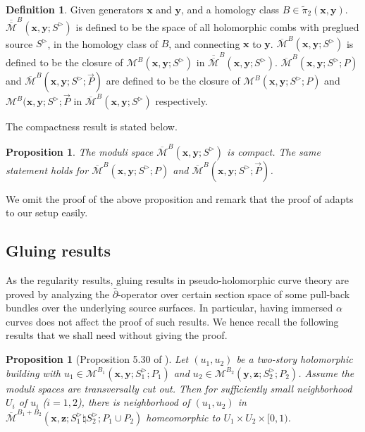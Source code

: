 \documentclass{amsart}
\newtheorem{prop}[thm]{Proposition}
\theoremstyle{definition}
\newtheorem{defn}[thm]{Definition}
\theoremstyle{remark}
\numberwithin{equation}{section}
\numberwithin{equation}{section} \makeatletter
\begin{document}
\begin{defn}
Given generators $\bm{x}$ and $\bm{y}$, and a homology class $B\in \tilde{\pi}_2(\bm{x},\bm{y})$. $\overline{\overline{\mathcal{M}}}^B(\textbf{x},\textbf{y};S^\triangleright)$ is defined to be the space of all holomorphic combs with preglued source $S^\triangleright$, in the homology class of $B$, and connecting $\bm{x}$ to $\bm{y}$. $\overline{\mathcal{M}}^B(\bm{x},\bm{y};S^\triangleright)$ is defined to be the closure of $\mathcal{M}^B(\bm{x},\bm{y};S^\triangleright)$ in $\overline{\overline{\mathcal{M}}}^B(\bm{x},\bm{y};S^\triangleright)$. $\overline{\mathcal{M}}^B(\bm{x},\bm{y};S^\triangleright; P)$ and $\overline{\mathcal{M}}^B(\bm{x},\bm{y};S^\triangleright; \overrightarrow{P})$ are defined to be the closure of $\mathcal{M}^B(\bm{x},\bm{y};S^\triangleright; P)$ and $\mathcal{M}^B(\bm{x},\bm{y};S^\triangleright; \overrightarrow{P}$ in $\overline{\mathcal{M}}^B(\bm{x},\bm{y};S^\triangleright)$ respectively.
\end{defn}

The compactness result is stated below. 
\begin{prop}\label{Proposition, compactness}
The moduli space $\overline{\mathcal{M}}^B(\bm{x},\bm{y};S^\triangleright)$ is compact. The same statement holds for $\overline{\mathcal{M}}^B(\bm{x},\bm{y};S^\triangleright; P)$ and $\overline{\mathcal{M}}^B(\bm{x},\bm{y};S^\triangleright; \overrightarrow{P})$.
\end{prop}
We omit the proof of the above proposition and remark that the proof of \cite[Proposition 5.24]{LOT18} adapts to our setup easily. 

\subsection{Gluing results}
As the regularity results, gluing results in pseudo-holomorphic curve theory are proved by analyzing the $\bar{\partial}$-operator over certain section space of some pull-back bundles over the underlying source surfaces. In particular, having immersed $\alpha$ curves does not affect the proof of such results. We hence recall the following results that we shall need without giving the proof. 

\begin{prop}[Proposition 5.30 of \cite{LOT18}]
Let $(u_1,u_2)$ be a two-story holomorphic building with $u_1\in \mathcal{M}^{B_1}(\bm{x},\bm{y};S_1^\triangleright;P_1)$ and $u_2\in \mathcal{M}^{B_2}(\bm{y},\bm{z};S_2^\triangleright;P_2)$. Assume the moduli spaces are transversally cut out. Then for sufficiently small neighborhood $U_i$ of $u_i$ ($i=1,2$), there is neighborhood of $(u_1,u_2)$ in $\overline{\mathcal{M}}^{B_1+B_2}(\bm{x},\bm{z};S_1^\triangleright\natural S_2^\triangleright; P_1\cup P_2)$ homeomorphic to $U_1\times U_2 \times [0,1)$.
\end{prop}
\end{document}
